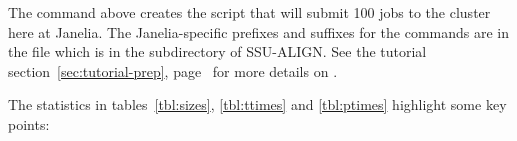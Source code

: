 



The  command above creates the
 script that will submit 100 
jobs to the cluster here at Janelia. The Janelia-specific prefixes and
suffixes for the commands are in the file
 which is in the 
subdirectory of SSU-ALIGN. See the tutorial
section~\ref{sec:tutorial-prep}, 
page~\pageref{sec:tutorial-prep} for more details on .

The statistics in tables~\ref{tbl:sizes}, \ref{tbl:ttimes} and
\ref{tbl:ptimes} highlight some key points:

